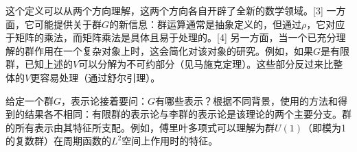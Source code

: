 这个定义可以从两个方向理解，这两个方向各自开辟了全新的数学领域。[3] 一方面，它可能提供关于群$G$的新信息：群运算通常是抽象定义的，但通过$\rho$，它对应于矩阵的乘法，而矩阵乘法是具体且易于处理的。[4] 另一方面，当一个已充分理解的群作用在一个复杂对象上时，这会简化对该对象的研究。例如，如果$G$是有限群，已知上述的$V$可以分解为不可约部分（见马施克定理）。这些部分反过来比整体的$V$更容易处理（通过舒尔引理）。

给定一个群$G$，表示论接着要问：$G$有哪些表示？根据不同背景，使用的方法和得到的结果各不相同：有限群的表示论与李群的表示论是该理论的两个主要分支。群的所有表示由其特征所支配。例如，傅里叶多项式可以理解为群$U(1)$（即模为1的复数群）在周期函数的$L^2$空间上作用时的特征。
